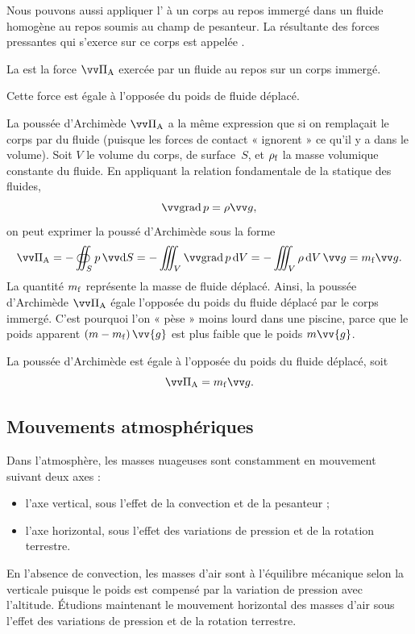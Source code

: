 \documentclass[12pt,fancy]{cours}
\begin{document}
Nous pouvons aussi appliquer l’ à un corps au repos immergé dans un fluide homogène au repos soumis au champ de pesanteur. La résultante des forces pressantes qui s’exerce sur ce corps est appelée .
\begin{definition}
  La  est la force $\Vec{\Pi}_{\rm A}$ exercée par un fluide au repos sur un corps immergé.
\end{definition}
Cette force est égale à l’opposée du poids de fluide déplacé.
\begin{demo}
  La poussée d’Archimède $\Vec{\Pi}_{\rm A}$  a la même expression que si on remplaçait le corps par du fluide (puisque les forces de contact « ignorent » ce qu’il y a dans le volume). Soit $V$ le volume du corps, de surface~$S$, et $\rho_{\rm f}$ la masse volumique constante du fluide. En appliquant la relation fondamentale de la statique des fluides,
  \begin{equation}
\Grad{p} = \rho \Vec{g},
\end{equation}
on peut exprimer la poussé d’Archimède sous la forme
\begin{equation}
  \Vec{\Pi}_{\rm A} = -\oiint_{S}p \,\Vec{\d S}= -\iiint_{V}\Grad{p}\,\d V = -\iiint_{V}\rho \,\d V \,\Vec{g} = m_{\rm f} \Vec{g}.
\end{equation}
La quantité $m_{\rm f}$ représente la masse de fluide déplacé. Ainsi,
la poussée d'Archimède $\Vec{\Pi}_{\rm{A}}$ égale l’opposée du poids du fluide déplacé par le corps immergé. C’est pourquoi l’on « pèse » moins lourd dans une piscine, parce que le poids apparent $\left(m-m_{\rm{f}}\right)\vv{g}$ est plus faible que le poids $m\vv{g}$.
\end{demo}

\begin{prop}\label{prop:}
  La poussée d’Archimède  est égale à l’opposée du poids du fluide déplacé, soit 
  \begin{equation*}
    \Vec{\Pi}_{\rm A} = m_{\rm f} \Vec{g}.
  \end{equation*}
\end{prop}


 \subsection{Mouvements atmosphériques} 
 
 Dans l'atmosphère, les masses nuageuses sont constamment en mouvement suivant deux axes :
 \begin{itemize}
  \item l'axe vertical, sous l'effet de la convection et de la pesanteur ;
  \item l'axe horizontal, sous l'effet des variations de pression et de la rotation terrestre.
 \end{itemize}
 En l'absence de convection, les masses d'air sont à l'équilibre mécanique selon la verticale puisque le poids est compensé par la variation de pression avec l'altitude. Étudions maintenant le mouvement horizontal des masses d'air sous l'effet des variations de pression et de la rotation terrestre.
\end{document}
